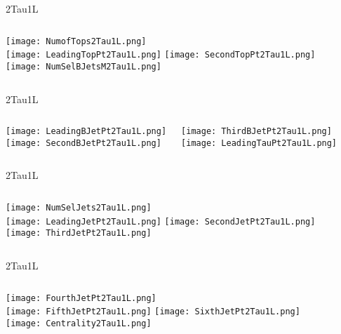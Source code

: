 \documentclass{beamer}
\begin{document}
\begin{frame}{2Tau1L}
    \begin{columns}[t]
    \centering
    \texttt{[image: NumofTops2Tau1L.png]}\\
    \texttt{[image: LeadingTopPt2Tau1L.png]}
    \centering
    \texttt{[image: SecondTopPt2Tau1L.png]}\\
    \texttt{[image: NumSelBJetsM2Tau1L.png]}
    \end{columns}
\end{frame}
\begin{frame}{2Tau1L}
    \begin{columns}[t]

    \centering
    \texttt{[image: LeadingBJetPt2Tau1L.png]}\\
    \texttt{[image: SecondBJetPt2Tau1L.png]}
     
    \centering
    \texttt{[image: ThirdBJetPt2Tau1L.png]}\\
    \texttt{[image: LeadingTauPt2Tau1L.png]}
    \end{columns}
\end{frame}
\begin{frame}{2Tau1L}
    \begin{columns}[t]
    \centering
    \texttt{[image: NumSelJets2Tau1L.png]}\\
    \texttt{[image: LeadingJetPt2Tau1L.png]}
    \centering
    \texttt{[image: SecondJetPt2Tau1L.png]}\\
    \texttt{[image: ThirdJetPt2Tau1L.png]}
    \end{columns}
\end{frame}
\begin{frame}{2Tau1L}
    \begin{columns}[t]
    \centering
    \texttt{[image: FourthJetPt2Tau1L.png]}\\
    \texttt{[image: FifthJetPt2Tau1L.png]}
    \centering
    \texttt{[image: SixthJetPt2Tau1L.png]}\\
    \texttt{[image: Centrality2Tau1L.png]}
    \end{columns}
\end{frame}
\end{document}
